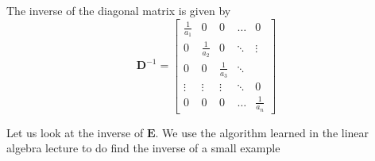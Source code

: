 \documentclass{article}
\begin{document}
The inverse of the diagonal matrix is given by
\begin{equation*}
    \mathbf{D}^{-1} = \begin{bmatrix}
        \frac{1}{a_{1}}& 0 & 0 & \dots & 0 \\
    0 & \frac{1}{a_{2}}& 0 & \ddots & \vdots \\
    0& 0 & \frac{1}{a_{3}} & \ddots & \\
    \vdots & \vdots & \vdots& \ddots & 0 \\
    0 & 0 & 0 & \dots & \frac{1}{a_{n}}
    \end{bmatrix}
\end{equation*}


\noindent Let us look at the inverse of $\mathbf{E}$. We use the algorithm learned in the linear algebra lecture to do find the inverse of a small example
\end{document}
